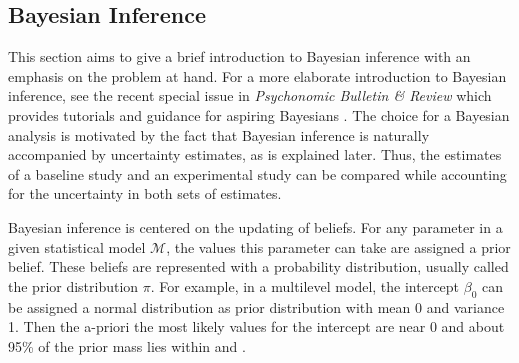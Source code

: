 \documentclass[a4paper]{article}
\newcommand{\model}{\mathcal{M}}
\newcommand{\dnorm}[2]{\text{Normal}\left(#1,\,#2\right)}
\begin{document}


\subsection*{Bayesian Inference}

This section aims to give a brief introduction to Bayesian inference with an emphasis on the problem at hand. For a more elaborate introduction to Bayesian inference, see the recent special issue in \emph{Psychonomic Bulletin \& Review} which provides tutorials and guidance for aspiring Bayesians \cite{VandekerckhoveEtAl2018SI}. The choice for a Bayesian analysis is motivated by the fact that Bayesian inference is naturally accompanied by uncertainty estimates, as is explained later. Thus, the estimates of a baseline study and an experimental study can be compared while accounting for the uncertainty in both sets of estimates.

Bayesian inference is centered on the updating of beliefs. For any parameter in a given statistical model $\model$, the values this parameter can take are assigned a prior belief. These beliefs are represented with a probability distribution, usually called the prior distribution $\pi$. For example, in a multilevel model, the intercept $\beta_0$ can be assigned a normal distribution as prior distribution with mean 0 and variance 1. Then the a-priori the most likely values for the intercept are near 0 and about 95\% of the prior mass lies within \pgfmathprintnumber{-\zCrit} and \pgfmathprintnumber{\zCrit}.
\end{document}
